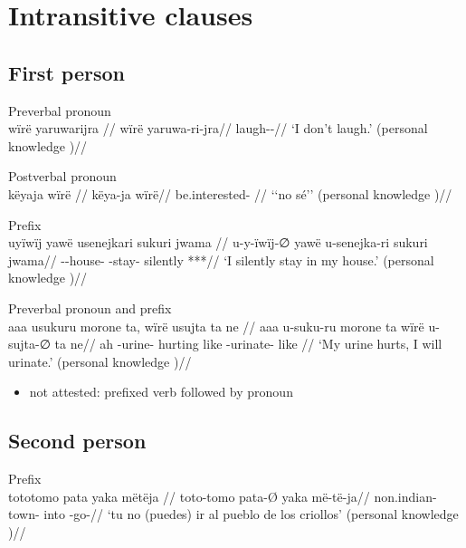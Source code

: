 \documentclass{memoir}
\begin{document}
\section{Intransitive clauses}

\subsection{First person}

\ex  Preverbal pronoun  \\\label{convrisamaj-4}
\begingl \glpreamble wïrë yaruwarijra //
\gla wïrë yaruwa-ri-jra//
\glb {} laugh--//
\glft ‘I don’t laugh.’ (personal knowledge
)//
\endgl
\xe

\ex  Postverbal pronoun  \\\label{convfemgrme-298}
\begingl \glpreamble këyaja wïrë //
\gla këya-ja wïrë//
\glb be.interested- //
\glft ‘‘no sé’’ (personal knowledge
)//
\endgl
\xe

\ex  Prefix  \\\label{convrisamaj-28}
\begingl \glpreamble uyïwïj yawë usenejkari sukuri jwama //
\gla u-y-ïwïj-∅ yawë u-senejka-ri sukuri jwama//
\glb {}--house-  -stay- silently ***//
\glft ‘I silently stay in my house.’ (personal knowledge
)//
\endgl
\xe

\ex  Preverbal pronoun and prefix  \\\label{ctorat-23}
\begingl \glpreamble aaa usukuru morone ta, wïrë usujta ta ne //
\gla aaa u-suku-ru morone ta wïrë u-sujta-∅ ta ne//
\glb ah -urine- hurting like  -urinate- like //
\glft ‘My urine hurts, I will urinate.’ (personal knowledge
)//
\endgl
\xe

\begin{itemize}
\tightlist
\item
  not attested: prefixed verb followed by pronoun
\end{itemize}

\subsection{Second person}

\ex  Prefix  \\\label{convamgu-7}
\begingl \glpreamble tototomo pata yaka mëtëja //
\gla toto-tomo pata-Ø yaka më-të-ja//
\glb non.indian- town- into -go-//
\glft ‘tu no (puedes) ir al pueblo de los criollos’ (personal knowledge
)//
\endgl
\xe
\end{document}
